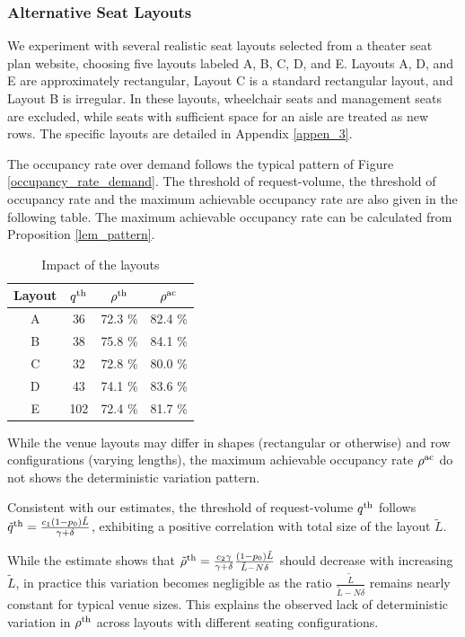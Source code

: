 \subsubsection{Alternative Seat Layouts}
We experiment with several realistic seat layouts selected from a theater seat plan website, choosing five layouts labeled A, B, C, D, and E. Layouts A, D, and E are approximately rectangular, Layout C is a standard rectangular layout, and Layout B is irregular. In these layouts, wheelchair seats and management seats are excluded, while seats with sufficient space for an aisle are treated as new rows. The specific layouts are detailed in Appendix \ref{appen_3}.

The occupancy rate over demand follows the typical pattern of Figure \ref{occupancy_rate_demand}. The threshold of request-volume, the threshold of occupancy rate and the maximum achievable occupancy rate are also given in the following table. The maximum achievable occupancy rate can be calculated from Proposition \ref{lem_pattern}.

\begin{table}[ht]
  \centering
  \caption{Impact of the layouts}
  \begin{tabular}{cccc}
  \hline
  \hline
   Layout & $q^{\textup{th}}$ & $\rho^{\textup{th}}$ & $\rho^{\textup{ac}}$ \\
  \hline
   A & 36 & 72.3 \% & 82.4 \% \\
   B & 38 & 75.8 \% & 84.1 \% \\
   C & 32 & 72.8 \% & 80.0 \% \\
   D & 43 & 74.1 \%  & 83.6 \% \\
   E & 102 & 72.4 \% & 81.7 \% \\
   \hline
   \hline
  \end{tabular}
\end{table}

While the venue layouts may differ in shapes (rectangular or otherwise) and row configurations (varying lengths), the maximum achievable occupancy rate $\rho^{\textup{ac}}$ do not shows the deterministic variation pattern.

Consistent with our estimates, the threshold of request-volume $q^{\textup{th}}$ follows $\tilde{q}^{\textup{th}} =  \frac{c_1 (1-p_0) \tilde{L}}{\gamma + \delta}$, exhibiting a positive correlation with total size of the layout $\tilde{L}$. 

While the estimate shows that $\tilde{\rho}^{\textup{th}} = \frac{c_2 \gamma}{\gamma +\delta} \frac{(1-p_0) \tilde{L}}{\tilde{L}-N \delta}$ should decrease with increasing $\tilde{L}$, in practice this variation becomes negligible as the ratio $\frac{\tilde{L}}{\tilde{L}-N\delta}$ remains nearly constant for typical venue sizes. This explains the observed lack of deterministic variation in 
$\rho^{\textup{th}}$ across layouts with different seating configurations.


